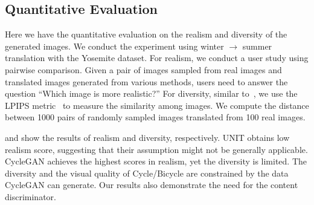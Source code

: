 \documentclass[runningheads]{llncs}
\begin{document}
\subsection{Quantitative Evaluation}
 \vspace{\subsecmargin}
%
Here we have the quantitative evaluation on the realism and diversity of the generated images.
%
We conduct the experiment using winter $\rightarrow$ summer translation with the Yosemite dataset.
%
For realism, we conduct a user study using pairwise comparison.
%
Given a pair of images sampled from real images and translated images generated from various methods, users need to answer the question  ``Which image is more realistic?''
%
For diversity, similar to~\cite{zhu2017bicyclegan}, we use the LPIPS metric~\cite{zhang2018perceptual} to measure the similarity among images.
%
We compute the distance between 1000 pairs of randomly sampled images translated from 100 real images.
%

 and  show the results of realism and diversity, respectively.
%
%
UNIT obtains low realism score, suggesting that their assumption might not be generally applicable.
% 
CycleGAN achieves the highest scores in realism, yet the diversity is limited.
%
The diversity and the visual quality of Cycle/Bicycle are constrained by the data CycleGAN can generate.
%
Our results also demonstrate the need for the content discriminator.
%

\end{document}
